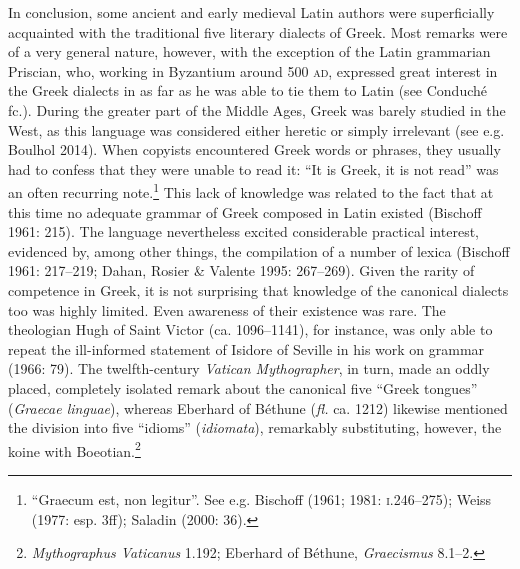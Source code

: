 \begin{styleStandard}
In conclusion, some ancient and early medieval Latin authors were superficially acquainted with the traditional five literary dialects of Greek. Most remarks were of a very general nature, however, with the exception of the Latin grammarian Priscian, who, working in Byzantium around 500 \textsc{ad}, expressed great interest in the Greek dialects in as far as he was able to tie them to Latin (see Conduché fc.). During the greater part of the Middle Ages, Greek was barely studied in the West, as this language was considered either heretic or simply irrelevant (see e.g. Boulhol 2014). When copyists encountered Greek words or phrases, they usually had to confess that they were unable to read it: “It is Greek, it is not read” was an often recurring note.\footnote{\textrm{ }“Graecum est, non legitur”. \textrm{See e.g. Bischoff (1961; 1981: }\textrm{\textsc{i.}}\textrm{246–275); Weiss (1977: esp. 3ff);}\textrm{\textsc{ }}\textrm{Saladin (2000: 36).}} This lack of knowledge was related to the fact that at this time no adequate grammar of Greek composed in Latin existed (Bischoff 1961: 215). The language nevertheless excited considerable practical interest, evidenced by, among other things, the compilation of a number of lexica (Bischoff 1961: 217–219; Dahan, Rosier \& Valente 1995: 267–269). Given the rarity of competence in Greek, it is not surprising that knowledge of the canonical dialects too was highly limited. Even awareness of their existence was rare. The theologian Hugh of Saint Victor (ca. 1096–1141), for instance, was only able to repeat the ill-informed statement of Isidore of Seville in his work on grammar (1966: 79). The twelfth-century \textit{Vatican Mythographer}, in turn, made an oddly placed, completely isolated remark about the canonical five “Greek tongues” (\textit{Graecae linguae}), whereas Eberhard of Béthune (\textit{fl.} ca. 1212) likewise mentioned the division into five “idioms” (\textit{idiomata}), remarkably substituting, however, the koine with Boeotian.\footnote{ \textit{Mythographus Vaticanus} 1.192; Eberhard of Béthune, \textit{Graecismus} 8.1–2.}
\end{styleStandard}

